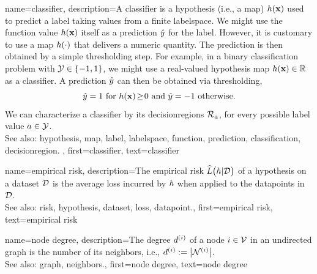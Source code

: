 {name={classifier},
	description={A classifier is a \gls{hypothesis} (i.e., a \gls{map}) $h({\bf x})$ 
		used to predict a \gls{label} taking values from a finite \gls{labelspace}. We might use the 
		\gls{function} value $h({\bf x})$ itself as a \gls{prediction} $\hat{y}$ for 
		the \gls{label}. However, it is customary to use a \gls{map} $h(\cdot)$ that delivers 
		a numeric quantity. The \gls{prediction} is then obtained by a simple thresholding step. 
		For example, in a binary \gls{classification} problem with \label{labelspace} $\mathcal{Y} \in  \{ -1,1\}$, 
		we might use a real-valued \gls{hypothesis} \gls{map} $h({\bf x}) \in \mathbb{R}$ 
		as a classifier. A \gls{prediction} $\hat{y}$ can then be obtained via thresholding,  
		 \begin{equation} 
		 	\label{equ_def_threshold_bin_classifier_dict}
		 	\hat{y} =1   \mbox{ for } h({\bf x})\!\geq\!0 \mbox{ and } 	\hat{y} =-1  \mbox{ otherwise.}
	 		\end{equation}
 		We can characterize a classifier by its \glspl{decisionregion} $\mathcal{R}_{a}$, for 
 		every possible \gls{label} value $a \in \mathcal{Y}$.
					\\ 
		See also: \gls{hypothesis}, \gls{map}, \gls{label}, \gls{labelspace}, \gls{function}, \gls{prediction}, \gls{classification}, \gls{decisionregion}. },
	first={classifier},
	text={classifier} 
}

{name={empirical risk},
  description={The empirical \gls{risk} $\widehat{L}\big(h|\mathcal{D}\big)$ 
  	of a \gls{hypothesis} on a \gls{dataset} $\mathcal{D}$ is the average \gls{loss} incurred 
  	by $h$ when applied to the \glspl{datapoint} in $\mathcal{D}$.
				\\ 
		See also: \gls{risk}, \gls{hypothesis}, \gls{dataset}, \gls{loss}, \gls{datapoint}.},
  first={empirical risk},
  text={empirical risk} 
}

{name={node degree},
	description={The degree $d^{(i)}$ of a node $i \in \mathcal{V}$ 
		in an undirected \gls{graph} is the number of its \gls{neighbors}, i.e., $d^{(i)} := \big|\mathcal{N}^{(i)}\big|$.
					\\ 
		See also: \gls{graph}, \gls{neighbors}.},
	first={node degree},
	text={node degree} 
}

